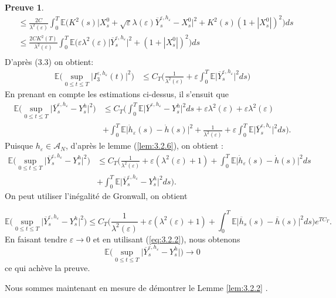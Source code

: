 \documentclass[12pt,a4paper,twoside]{report}%
\theoremstyle{definition}
\newtheorem*{pr}{\textbf{Preuve}}
\numberwithin{equation}{section}
\begin{document}
\begin{pr}
\[\begin{aligned}
		&\leq \frac{2C}{\lambda^2(\varepsilon)} \int_{0}^{T}\mathbb{E}\Big(K^2(s)\big|X_s^0 + \sqrt{\varepsilon}\lambda(\varepsilon)\overline{Y}_s^{\varepsilon,h_\varepsilon} -X_s^0\big|^2+K^2(s)(1+|X_s^0|)^2\Big)ds\\
		&\leq \frac{2CK^2(T)}{\lambda^2(\varepsilon)}\int_{0}^{T}\mathbb{E}\Big( \varepsilon\lambda^2(\varepsilon)\big| \overline{Y}_s^{\varepsilon,h_\varepsilon}\big|^2+(1+|X_s^0|)^2\Big)ds\\
	\end{aligned}
	\]
	D'après (3.3) on obtient:
	\[
	\begin{aligned}
		\mathbb{E}\big(\sup_{0 \leq t \leq T}\big|I_3^{\varepsilon,h_\varepsilon}(t)\big|^2\big)&\leq C_T\big(\frac{1}{\lambda^2(\varepsilon)} +\varepsilon\int_{ 0}^{T}\mathbb{E}\big|\overline{Y}_s^{\varepsilon,h_\varepsilon}\big|^2ds\big)
	\end{aligned}
	\]
	En prenant en compte les estimations ci-dessus, il s'ensuit que
	\[
	\begin{aligned}
	\mathbb{E}\big(\sup_{0 \leq t \leq T}\big|\overline{Y}_s^{\varepsilon,h_\varepsilon}-Y_s^h\big|^2\big)&\leq C_T\Big( \int_{0}^{T}\mathbb{E}\Big|\overline{Y}^{\varepsilon,h_\varepsilon}-Y_s^h\Big|^2ds + \varepsilon\lambda^2(\varepsilon) + \varepsilon\lambda^2(\varepsilon) \\&+ \int_{0}^{T}\mathbb{E}\big|\dot{h}_\varepsilon(s)-\dot{h}(s)\big|^2+\frac{1}{\lambda^2(\varepsilon)} +\varepsilon\int_{ 0}^{T}\mathbb{E}\big|\overline{Y}_s^{\varepsilon,h_\varepsilon}\big|^2ds\Big).
	\end{aligned}
	\]
Puisque $h_\varepsilon \in \mathscr{A}_N$, d'après le lemme (\ref{lem:3.2.6}), on obtient :
\[
\begin{aligned}
\mathbb{E}\big(\sup_{0 \leq t \leq T}\big|\overline{Y}_s^{\varepsilon,h_\varepsilon}-Y_s^h\big|^2\big)&\leq C_T\Big( \frac{1}{\lambda^2(\varepsilon)} + \varepsilon(\lambda^2(\varepsilon)+ 1) + \int_{0}^{T}\mathbb{E}\big|\dot{h}_\varepsilon(s)-\dot{h}(s)\big|^2ds \\&+ \int_{0}^{T}\mathbb{E}\big|\overline{Y}_s^{\varepsilon,h_\varepsilon}-Y_s^h\big|^2ds \Big).
\end{aligned}
\]
On peut utiliser l'inégalité de Gronwall, on obtient

\[
\mathbb{E}\big(\sup_{0 \leq t \leq T}\big|\overline{Y}_s^{\varepsilon,h_\varepsilon}-Y_s^h\big|^2\big)\leq C_T\Big(\frac{1}{\lambda^2(\varepsilon)}+ \varepsilon(\lambda^2(\varepsilon)+1) + \int_{0}^{T}\mathbb{E}\big|\overline{h}_s(s)-\overline{h}(s)\big|^2ds\Big)e^{TC_T}.
\]
En faisant tendre $\varepsilon \to 0$ et en utilisant (\ref{eq:3.2.2}), nous obtenons
\[
\mathbb{E}\big(\sup_{0 \leq t \leq T}\big|\overline{Y}_s^{\varepsilon,h_\varepsilon} - Y_s^h\big|\big) \to 0
\]
ce qui achève la preuve.
	 \end{pr}
Nous sommes maintenant en mesure de démontrer le Lemme \ref{lem:3.2.2} .
\end{document}
